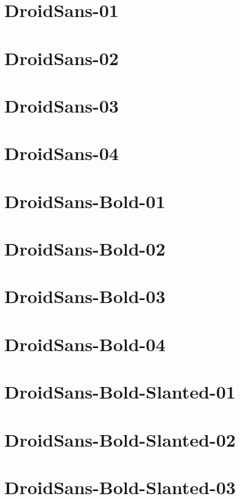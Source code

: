 \documentclass{article}
\begin{document}
\section{DroidSans-01}

\section{DroidSans-02}

\section{DroidSans-03}

\section{DroidSans-04}

\section{DroidSans-Bold-01}

\section{DroidSans-Bold-02}

\section{DroidSans-Bold-03}

\section{DroidSans-Bold-04}

\section{DroidSans-Bold-Slanted-01}

\section{DroidSans-Bold-Slanted-02}

\section{DroidSans-Bold-Slanted-03}
\end{document}
